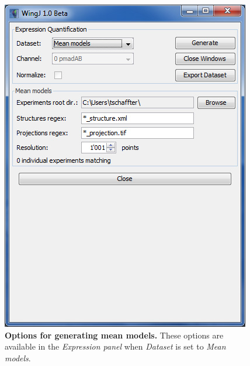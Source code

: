 \begin{figure}[!h]
\centering
\includegraphics[scale=0.7]{images/expression_panel_4.jpg}
\caption{\textbf{Options for generating mean models.} These options are available in the \textit{Expression panel} when \textit{Dataset} is set to \textit{Mean models}.}
\label{fig:wingj_expression_maps_mean_interface}
\end{figure}

